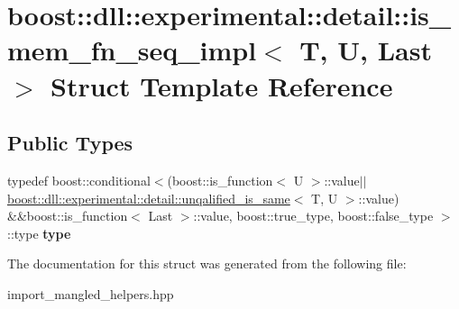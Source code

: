 \hypertarget{a01516}{}\section{boost\+:\+:dll\+:\+:experimental\+:\+:detail\+:\+:is\+\_\+mem\+\_\+fn\+\_\+seq\+\_\+impl$<$ T, U, Last $>$ Struct Template Reference}
\label{a01516}
\subsection*{Public Types}
\begin{DoxyCompactItemize}
\item 
\mbox{\label{a01516_a4689022563a599f3389c7defc6210274}} 
typedef boost\+::conditional$<$(boost\+::is\+\_\+function$<$ U $>$\+::value$\vert$$\vert$\hyperlink{a01444}{boost\+::dll\+::experimental\+::detail\+::unqalified\+\_\+is\+\_\+same}$<$ T, U $>$\+::value) \&\&boost\+::is\+\_\+function$<$ Last $>$\+::value, boost\+::true\+\_\+type, boost\+::false\+\_\+type $>$\+::type {\bfseries type}
\end{DoxyCompactItemize}


The documentation for this struct was generated from the following file\+:\begin{DoxyCompactItemize}
\item 
import\+\_\+mangled\+\_\+helpers.\+hpp\end{DoxyCompactItemize}
